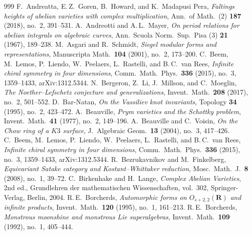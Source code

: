 \begin{thebibliography}{999}
 F.~Andreatta, E.\,Z.~Goren, B.~Howard, and K.~Madapusi Pera, \emph{Faltings heights of abelian varieties with complex multiplication}, Ann.\ of Math.\ (2) \textbf{187} (2018), no.~2, 391--531.
 A.~Andreotti and A.\,L.~Mayer, \emph{On period relations for abelian integrals on algebraic curves}, Ann.\ Scuola Norm.\ Sup.\ Pisa (3) \textbf{21} (1967), 189--238.
 M.~Asgari and R.~Schmidt, \emph{Siegel modular forms and representations}, Manuscripta Math.\ \textbf{104} (2001), no.~2, 173--200.
 C.~Beem, M.~Lemos, P.~Liendo, W.~Peelaers, L.~Rastelli, and B.\,C.~van Rees, \emph{Infinite chiral symmetry in four dimensions}, Comm.\ Math.\ Phys.\ \textbf{336} (2015), no.~3, 1359--1433, arXiv:1312.5344. %
 N.~Bergeron, Z.~Li, J.~Millson, and C.~Moeglin, \emph{The Noether--Lefschetz conjecture and generalizations}, Invent.\ Math.\ \textbf{208} (2017), no.~2, 501--552.
 D.~Bar-Natan, \emph{On the Vassiliev knot invariants}, Topology \textbf{34} (1995), no.~2, 423--472. %
 A.~Beauville, \emph{Prym varieties and the Schottky problem}, Invent.\ Math.\ \textbf{41} (1977), no.~2, 149--196.
 A.~Beauville and C.~Voisin, \emph{On the Chow ring of a $K3$ surface}, J.~Algebraic Geom.\ \textbf{13} (2004), no.~3, 417--426.
 C.~Beem, M.~Lemos, P.~Liendo, W.~Peelaers, L.~Rastelli, and B.\,C.~van Rees, \emph{Infinite chiral symmetry in four dimensions}, Comm.\ Math.\ Phys.\ \textbf{336} (2015), no.~3, 1359--1433, arXiv:1312.5344. %
 R.~Bezrukavnikov and M.~Finkelberg, \emph{Equivariant Satake category and Kostant--Whittaker reduction}, Mosc.\ Math.\ J.\ \textbf{8} (2008), no.~1, 39--72.
 C.~Birkenhake and H.~Lange, \emph{Complex Abelian Varieties}, 2nd ed., Grundlehren der mathematischen Wissenschaften, vol.~302, Springer-Verlag, Berlin, 2004.
 R.\,E.~Borcherds, \emph{Automorphic forms on $O_{s+2,2}(\mathbf{R})$ and infinite products}, Invent.\ Math.\ \textbf{120} (1995), no.~1, 161--213. %
 R.\,E.~Borcherds, \emph{Monstrous moonshine and monstrous Lie superalgebras}, Invent.\ Math.\ \textbf{109} (1992), no.~1, 405--444. %

\end{thebibliography}
